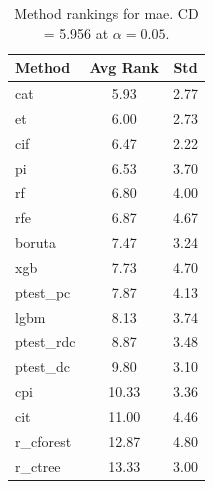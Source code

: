 \begin{table}[h]
\centering
\caption{Method rankings for mae. CD = 5.956 at $\alpha=0.05$.}
\label{tab:ranks_mae}
\begin{tabular}{lcc}
\toprule
Method & Avg Rank & Std \\
\midrule
cat & 5.93 & 2.77 \\
et & 6.00 & 2.73 \\
cif & 6.47 & 2.22 \\
pi & 6.53 & 3.70 \\
rf & 6.80 & 4.00 \\
rfe & 6.87 & 4.67 \\
boruta & 7.47 & 3.24 \\
xgb & 7.73 & 4.70 \\
ptest_pc & 7.87 & 4.13 \\
lgbm & 8.13 & 3.74 \\
ptest_rdc & 8.87 & 3.48 \\
ptest_dc & 9.80 & 3.10 \\
cpi & 10.33 & 3.36 \\
cit & 11.00 & 4.46 \\
r_cforest & 12.87 & 4.80 \\
r_ctree & 13.33 & 3.00 \\
\bottomrule
\end{tabular}
\end{table}